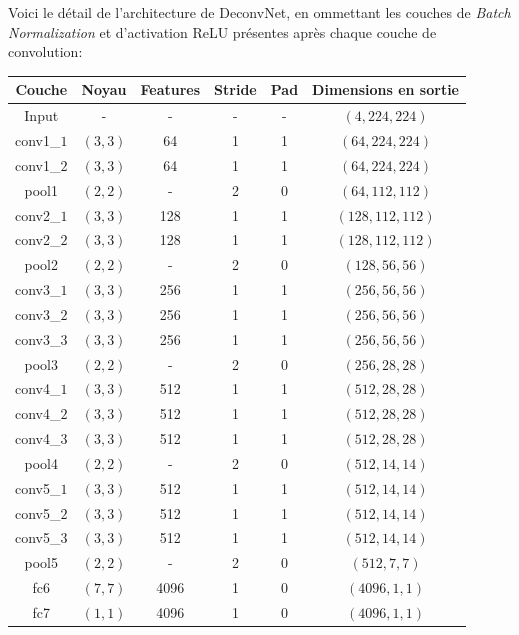 \documentclass[a4paper, 11pt]{report}
\begin{document}
Voici le détail de l'architecture de DeconvNet, en ommettant les couches de \emph{Batch Normalization} et d'activation ReLU présentes après chaque couche de convolution:
\begin{center}
	\begin{tabular}{|c|c|c|c|c|c|}
	\hline 
	Couche & Noyau & Features & Stride & Pad & Dimensions en sortie \\ 
	\hline 
	Input & - & - & - & - & $(4, 224, 224)$\\ 
	\hline 
	conv1\_$1$ & $(3, 3)$ & 64 & 1 & 1 & $(64, 224, 224)$ \\
	\hline 
	conv1\_$2$ & $(3, 3)$ & 64 & 1 & 1 & $(64, 224, 224)$ \\
	\hline 
	pool1 & $(2, 2)$ & - & 2 & 0 & $(64, 112, 112)$ \\
	\hline 
	conv2\_$1$ & $(3, 3)$ & 128 & 1 & 1 & $(128, 112, 112)$ \\
	\hline 
	conv2\_$2$ & $(3, 3)$ & 128 & 1 & 1 & $(128, 112, 112)$ \\
	\hline 
	pool2 & $(2, 2)$ & - & 2 & 0 & $(128, 56, 56)$ \\
	\hline 
	conv3\_$1$ & $(3, 3)$ & 256 & 1 & 1 & $(256, 56, 56)$ \\
	\hline 
	conv3\_$2$ & $(3, 3)$ & 256 & 1 & 1 & $(256, 56, 56)$ \\
	\hline 
	conv3\_$3$ & $(3, 3)$ & 256 & 1 & 1 & $(256, 56, 56)$ \\
	\hline 
	pool3 & $(2, 2)$ & - & 2 & 0 & $(256, 28, 28)$ \\
	\hline 
	conv4\_$1$ & $(3, 3)$ & 512 & 1 & 1 & $(512, 28, 28)$ \\
	\hline 
	conv4\_$2$ & $(3, 3)$ & 512 & 1 & 1 & $(512, 28, 28)$ \\
	\hline 
	conv4\_$3$ & $(3, 3)$ & 512 & 1 & 1 & $(512, 28, 28)$ \\
	\hline 
	pool4 & $(2, 2)$ & - & 2 & 0 & $(512, 14, 14)$ \\
	\hline 
	conv5\_$1$ & $(3, 3)$ & 512 & 1 & 1 & $(512, 14, 14)$ \\
	\hline
	conv5\_$2$ & $(3, 3)$ & 512 & 1 & 1 & $(512, 14, 14)$ \\
	\hline
	conv5\_$3$ & $(3, 3)$ & 512 & 1 & 1 & $(512, 14, 14)$ \\
	\hline
	pool5 & $(2, 2)$ & - & 2 & 0 & $(512, 7, 7)$ \\
	\hline
	fc6 & $(7, 7)$ & 4096 & 1 & 0 & $(4096, 1, 1)$ \\
	\hline
	fc7 & $(1, 1)$ & 4096 & 1 & 0 & $(4096, 1, 1)$ \\
	\hline

\end{tabular}
\end{center}
\end{document}
